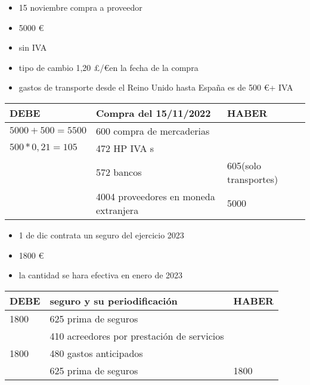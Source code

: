 \documentclass[a4paper,12pt]{article}
\begin{document}
\begin{itemize}
    \item 15 noviembre compra a proveedor 
    \item 5000 \euro
    \item sin IVA
    \item tipo de cambio 1,20 \pounds/\euro en la fecha de la compra
    \item gastos de transporte desde el Reino Unido hasta España es de 500 \euro + IVA 
\end{itemize}

\begin{table}[H]
    \centering
    \begin{tabular}{|p{3cm}|p{6cm}|p{3cm}|}
    \hline
    \textbf{DEBE} & \textbf{Compra del 15/11/2022} & \textbf{HABER} \\
    \hline
    $5000+500=5500$& 600 compra de mercaderias& \\
    \hline
    $500 * 0,21 = 105$& 472 HP IVA s& \\
    \hline
    & 572 bancos & 605(solo transportes) \\
    \hline
    & 4004 proveedores en moneda extranjera& 5000\\
    \hline
    \end{tabular}
\end{table}

\begin{itemize}
    \item 1 de dic contrata un seguro del ejercicio 2023
    \item 1800 \euro
    \item la cantidad se hara efectiva en enero de 2023
\end{itemize}
\begin{table}[H]
    \centering
    \begin{tabular}{|p{3cm}|p{6cm}|p{3cm}|}
    \hline
    \textbf{DEBE} & \textbf{seguro y su periodificación} & \textbf{HABER} \\
    \hline
    1800& 625 prima de seguros & \\
    \hline
    & 410 acreedores por prestación de servicios & \\
    \hline
    1800& 480 gastos anticipados&  \\
    \hline
    & 625 prima de seguros& 1800 \\
    \hline
    \end{tabular}
\end{table}
\end{document}
